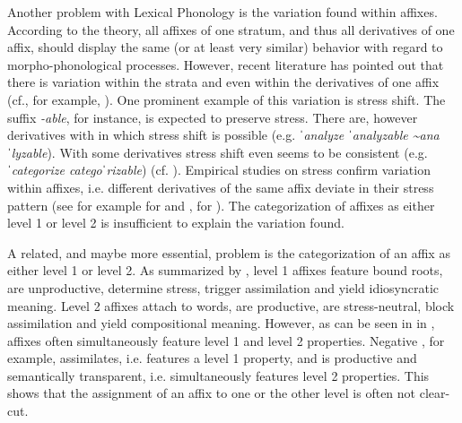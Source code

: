 Another problem with Lexical Phonology is the variation found within affixes. According to the theory, all affixes of one stratum, and thus all derivatives of one affix, should display the same (or at least very similar) behavior with regard to morpho-phonological processes. However, recent literature has pointed out that there is variation within the strata and even within the derivatives of one affix (cf., for example, \citealt{Raffelsiefen.1999,Bauer.2013, Plag.2014, BermudezOtero.2017}).  One prominent example of this variation is stress shift. The suffix \textit{-able}, for instance, is expected to preserve stress. There are, however derivatives with  in which stress shift is possible (e.g. \textit{ˈanalyze \textendash ˈanalyzable \textasciitilde anaˈlyzable}). With some derivatives stress shift even seems to  be consistent (e.g. \textit{ˈcategorize \textendash categoˈrizable}) (cf. \citealt[213 f.]{Plag.2014}). Empirical studies on stress confirm variation within affixes, i.e. different derivatives of the same affix deviate in their stress pattern (see for example \cite{Collie.2008} for  and , \cite{Sanz.2017} for ). The categorization of affixes as either level 1 or level 2 is insufficient to explain the variation found. 

A related, and maybe more essential, problem is the categorization of an affix as either level 1 or level 2. As summarized by \citet[134]{Raffelsiefen.1999}, level 1 affixes feature bound roots, are unproductive, determine stress, trigger assimilation and yield idiosyncratic meaning. Level 2 affixes attach to words, are productive, are stress-neutral, block assimilation and yield compositional meaning. However, as can be seen in  in , affixes often simultaneously feature level 1 and level 2 properties. Negative , for example, assimilates, i.e. features a level 1 property, and is productive and semantically transparent, i.e. simultaneously features level 2 properties. This shows that the assignment of an affix to one or the other level is often not clear-cut. 

